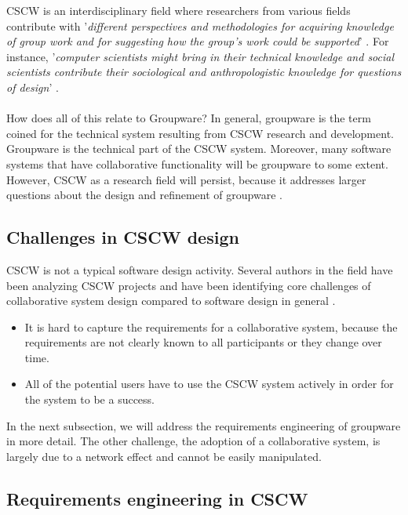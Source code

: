 CSCW is an interdisciplinary field where researchers from various fields contribute with '\textit{different perspectives and methodologies for acquiring knowledge of group work and for suggesting how the group's work could be supported}' \cite{CSCWGroupware}. For instance, '\textit{computer scientists might bring in their technical knowledge and social scientists contribute their sociological and anthropologistic knowledge for questions of design}' \cite{CSCWMethodology}.
\\ \\
How does all of this relate to Groupware? In general, groupware is the term coined for the technical system resulting from CSCW research and development. Groupware is the technical part of the CSCW system. Moreover, many software systems that have collaborative functionality will be groupware to some extent. However, CSCW as a research field will persist, because it addresses larger questions about the design and refinement of groupware \cite{CSCWReadings}.

\subsection{Challenges in CSCW design}

CSCW is not a typical software design activity. Several authors in the field have been analyzing CSCW projects and have been identifying core challenges of collaborative system design compared to software design in general \cite{CSCWConcepts}. 

\begin{itemize}
\item{It is hard to capture the requirements for a collaborative system, because the requirements are not clearly known to all participants or they change over time.}
\item{All of the potential users have to use the CSCW system actively in order for the system to be a success.}
\end{itemize}

In the next subsection, we will address the requirements engineering of groupware in more detail. The other challenge, the adoption of a collaborative system, is largely due to a network effect and cannot be easily manipulated.

\subsection{Requirements engineering in CSCW}

